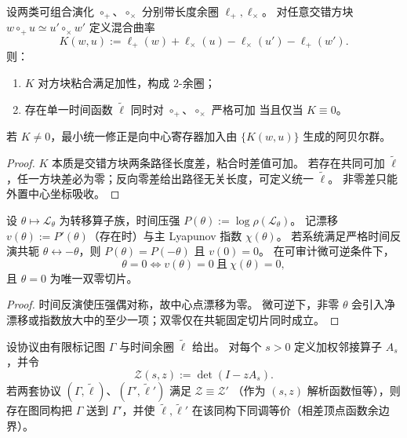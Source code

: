 \begin{theorem}\label{thm:xi-mixed-curvature-zero-criterion}
设两类可组合演化 \(\circ_+\)、\(\circ_\times\) 分别带长度余圈 \(\ell_+,\ell_\times\)。
对任意交错方块
\(
w\circ_+u\simeq u'\circ_\times w'
\)
定义混合曲率
\[
K(w,u):=\ell_+(w)+\ell_\times(u)-\ell_\times(u')-\ell_+(w').
\]
则：
\begin{enumerate}
  \item \(K\) 对方块粘合满足加性，构成 \(2\)-余圈；
  \item 存在单一时间函数 \(\widetilde\ell\) 同时对 \(\circ_+\)、\(\circ_\times\) 严格可加
  当且仅当 \(K\equiv 0\)。
\end{enumerate}
若 \(K\neq 0\)，最小统一修正是向中心寄存器加入由 \(\{K(w,u)\}\) 生成的阿贝尔群。
\end{theorem}

\begin{proof}
\(K\) 本质是交错方块两条路径长度差，粘合时差值可加。
若存在共同可加 \(\widetilde\ell\)，任一方块差必为零；反向零差给出路径无关长度，可定义统一 \(\widetilde\ell\)。
非零差只能外置中心坐标吸收。
\end{proof}

\begin{theorem}\label{thm:xi-critical-slice-pressure-zero-drift-lyapunov}
设 \(\theta\mapsto\mathcal L_\theta\) 为转移算子族，时间压强
\(
P(\theta):=\log\rho(\mathcal L_\theta)
\)。
记漂移 \(v(\theta):=P'(\theta)\)（存在时）与主 Lyapunov 指数 \(\chi(\theta)\)。
若系统满足严格时间反演共轭 \(\theta\leftrightarrow-\theta\)，则 \(P(\theta)=P(-\theta)\) 且 \(v(0)=0\)。
在可审计微可逆条件下，
\[
\theta=0
\Longleftrightarrow
v(\theta)=0\ \text{且}\ \chi(\theta)=0,
\]
且 \(\theta=0\) 为唯一双零切片。
\end{theorem}

\begin{proof}
时间反演使压强偶对称，故中心点漂移为零。
微可逆下，非零 \(\theta\) 会引入净漂移或指数放大中的至少一项；双零仅在共轭固定切片同时成立。
\end{proof}

\begin{theorem}\label{thm:xi-time-zeta-identifiability-markov-cohomology}
设协议由有限标记图 \(\Gamma\) 与时间余圈 \(\widetilde\ell\) 给出。
对每个 \(s>0\) 定义加权邻接算子 \(A_s\)，并令
\[
\mathcal Z(s,z):=\det(I-zA_s).
\]
若两套协议 \((\Gamma,\widetilde\ell)\)、\((\Gamma',\widetilde\ell')\) 满足
\(
\mathcal Z\equiv \mathcal Z'
\)
（作为 \((s,z)\) 解析函数恒等），则存在图同构把 \(\Gamma\) 送到 \(\Gamma'\)，并使 \(\widetilde\ell,\widetilde\ell'\) 在该同构下同调等价（相差顶点函数余边界）。
\end{theorem}

